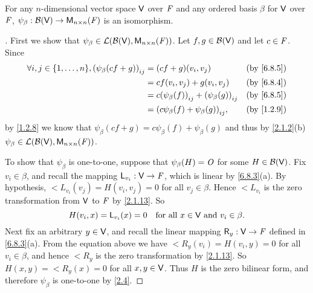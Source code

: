 \begin{thm}\label{6.32}
  For any \(n\)-dimensional vector space \(\mathsf{V}\) over \(\mathit{F}\) and any ordered basis \(\beta\) for \(\mathsf{V}\) over \(\mathit{F}\), \(\psi_{\beta} : \bi(\V) \to \ms[n][n][\F]\) is an isomorphism.
\end{thm}

\begin{proof}[]
  First we show that \(\psi_{\beta} \in \ls(\bi(\V), \ms[n][n][\F])\).
  Let \(f, g \in \mathcal{B}(\mathsf{V})\) and let \(c \in \mathit{F}\).
  Since
  \begin{align*}
    \forall i, j \in \set{1, \dots, n}, \pa{\psi_{\beta}(cf + g)}_{i j} & = (cf + g)(v_i, v_j)                                        &  & \by{6.8.5} \\
                                                                        & = c f(v_i, v_j) + g(v_i, v_j)                               &  & \by{6.8.4} \\
                                                                        & = c \pa{\psi_{\beta}(f)}_{i j} + \pa{\psi_{\beta}(g)}_{i j} &  & \by{6.8.5} \\
                                                                        & = \pa{c \psi_{\beta}(f) + \psi_{\beta}(g)}_{i j},           &  & \by{1.2.9}
  \end{align*}
  by \cref{1.2.8} we know that \(\psi_{\beta}(cf + g) = c \psi_{\beta}(f) + \psi_{\beta}(g)\) and thus by \cref{2.1.2}(b) \(\psi_{\beta} \in \ls(\bi(\V), \ms[n][n][\F])\).

  To show that \(\psi_{\beta}\) is one-to-one, suppose that \(\psi_{\beta}(H) = \mathit{O}\) for some \(H \in \mathcal{B}(\mathsf{V})\).
  Fix \(v_i \in \beta\), and recall the mapping \(\mathsf{L}_{v_i} : \mathsf{V} \to \mathit{F}\), which is linear by \cref{6.8.3}(a).
  By hypothesis, \(\lt{L}_{v_i}(v_j) = H(v_i, v_j) = 0\) for all \(v_j \in \beta\).
  Hence \(\lt{L}_{v_i}\) is the zero transformation from \(\mathsf{V}\) to \(\mathit{F}\) by \cref{2.1.13}.
  So
  \[
    H(v_i, x) = \mathsf{L}_{v_i}(x) = 0 \quad \text{for all } x \in \mathsf{V} \text{ and } v_i \in \beta.
  \]
  Next fix an arbitrary \(y \in \mathsf{V}\), and recall the linear mapping \(\mathsf{R}_y : \mathsf{V} \to \mathit{F}\) defined in \cref{6.8.3}(a).
  From the equation above we have \(\lt{R}_y(v_i) = H(v_i, y) = 0\) for all \(v_i \in \beta\), and hence \(\lt{R}_y\) is the zero transformation by \cref{2.1.13}.
  So \(H(x, y) = \lt{R}_y(x) = 0\) for all \(x, y \in \mathsf{V}\).
  Thus \(H\) is the zero bilinear form, and therefore \(\psi_{\beta}\) is one-to-one by \cref{2.4}.


\end{proof}
